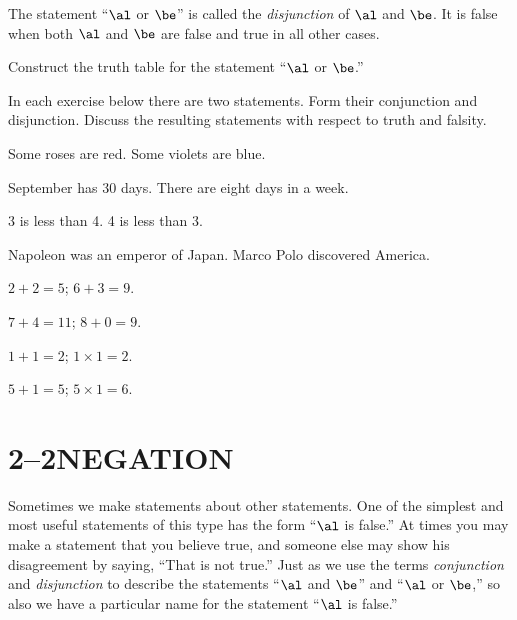\documentclass[11pt]{book}
\theoremstyle{bkplain}
\theoremstyle{XIplainnote}
\theoremstyle{bkplain}
\theoremstyle{bkplain}
\begin{document}
\begin{definition}
The statement ``$\al$ or $\be$'' is called the \emph{disjunction} of $\al$ and
$\be$. It is false when both $\al$ and $\be$ are false and true in all other
cases.
\end{definition}

\begin{IIproblem}
Construct the truth table for the statement ``$\al$ or $\be$.''
\end{IIproblem}


In each exercise below there are two statements. Form their conjunction and
disjunction. Discuss the resulting statements with respect to truth and falsity.

\begin{exercisecols}
\begin{exlist}
\item Some roses are red. Some violets are blue.
\item September has 30 days. There are eight days in a week.
\item 3 is less than 4. 4 is less than 3.
\item Napoleon was an emperor of Japan. Marco Polo discovered America.
\item $2 + 2 = 5$; \quad $6 + 3 = 9$.
\item $7 + 4 = 11$; \quad $8 + 0 = 9$.
\item $1 + 1 = 2$; \quad $1 \times 1 = 2$.
\item $5 + 1 = 5$; \quad $5 \times 1 = 6$.
\end{exlist}
\end{exercisecols}

\section*{2--2\quad NEGATION}

Sometimes we make statements about other statements. One of the simplest and most
useful statements of this type has the form ``$\al$ is false.'' At times you may
make a statement that you believe true, and someone else may show his
disagreement by saying, ``That is not true.'' Just as we use the terms
\emph{conjunction} and \emph{disjunction} to describe the statements ``$\al$ and
$\be$'' and ``$\al$ or $\be$,'' so also we have a particular name for the
statement ``$\al$ is false.''
\end{document}
